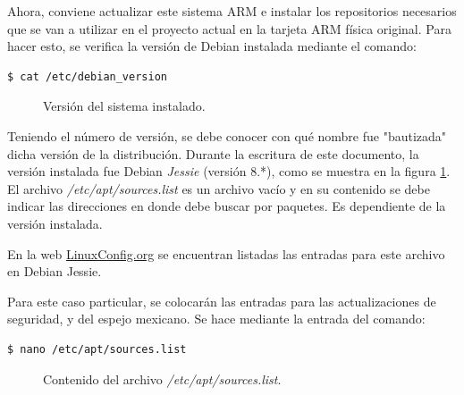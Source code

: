 Ahora, conviene actualizar este sistema ARM e instalar los repositorios necesarios que se van a utilizar en el proyecto actual en la tarjeta ARM física original. Para hacer esto, se verifica la versión de Debian instalada mediante el comando:

\begin{lstlisting}[language=bash]
$ cat /etc/debian_version 
\end{lstlisting}

\begin{figure}[H] %
\caption{Versión del sistema instalado.}
\label{fig:debVer}
\end{figure}

Teniendo el número de versión, se debe conocer con qué nombre fue "bautizada" dicha versión de la distribución. Durante la escritura de este documento, la versión instalada fue Debian \textit{Jessie} (versión 8.*), como se muestra en la figura \ref{fig:debVer}. El archivo \textit{/etc/apt/sources.list} es un archivo vacío y en su contenido se debe indicar las direcciones en donde debe buscar por paquetes. Es dependiente de la versión instalada.

En la web  \href{https://linuxconfig.org/debian-apt-get-jessie-sources-list}{LinuxConfig.org\footnotemark} se encuentran listadas las entradas para este archivo en Debian Jessie.


Para este caso particular, se colocarán las entradas para las actualizaciones de seguridad, y del espejo mexicano. Se hace mediante la entrada del comando:

\begin{lstlisting}[language=bash]
$ nano /etc/apt/sources.list
\end{lstlisting}

\begin{figure}[H] %
\caption{Contenido del archivo \textit{/etc/apt/sources.list}.}
\label{fig:sources}
\end{figure}

